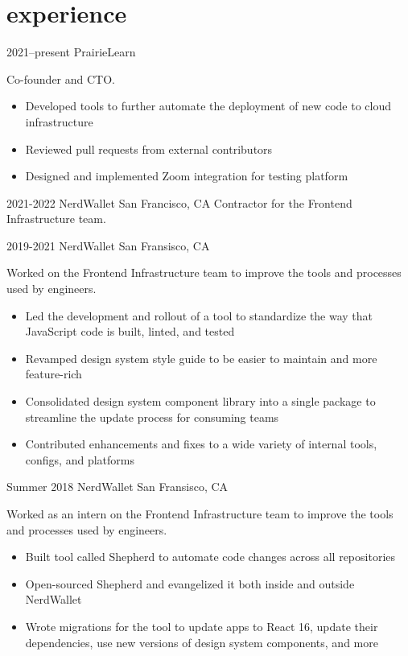 \documentclass[nofooter]{resume}
\begin{document}

\section{experience}

\begin{entrylist}

\entry
{2021--present}
{PrairieLearn}
{}
{Co-founder and CTO.
\noindent\begin{itemize}[leftmargin=0.45cm]
\item Developed tools to further automate the deployment of new code to cloud infrastructure
\item Reviewed pull requests from external contributors
\item Designed and implemented Zoom integration for testing platform
\end{itemize}}


\entry
{2021-2022}
{NerdWallet}
{San Francisco, CA}
{Contractor for the Frontend Infrastructure team.}


\entry
{2019-2021}
{NerdWallet}
{San Fransisco, CA}
{Worked on the Frontend Infrastructure team to improve the tools and processes used by engineers.
\noindent\begin{itemize}[leftmargin=0.45cm]
\item Led the development and rollout of a tool to standardize the way that JavaScript code is built, linted, and tested
\item Revamped design system style guide to be easier to maintain and more feature-rich
\item Consolidated design system component library into a single package to streamline the update process for consuming teams
\item Contributed enhancements and fixes to a wide variety of internal tools, configs, and platforms
\end{itemize}}


\entry
{Summer 2018}
{NerdWallet}
{San Fransisco, CA}
{Worked as an intern on the Frontend Infrastructure team to improve the tools and processes used by engineers.
\noindent\begin{itemize}[leftmargin=0.45cm]
\item Built tool called Shepherd to automate code changes across all repositories
\item Open-sourced Shepherd and evangelized it both inside and outside NerdWallet
\item Wrote migrations for the tool to update apps to React 16, update their dependencies, use new versions of design system components, and more
\end{itemize}}


\end{entrylist}
\end{document}

